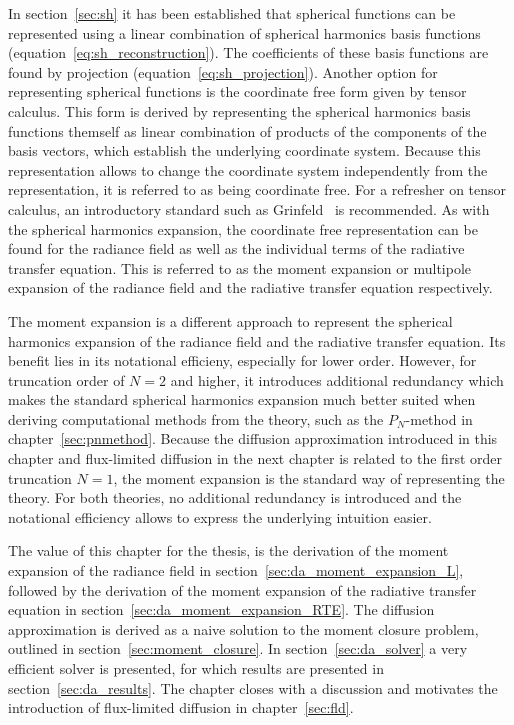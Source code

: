 In section~\ref{sec:sh} it has been established that spherical functions can be represented using a linear combination of spherical harmonics basis functions (equation~\ref{eq:sh_reconstruction}). The coefficients of these basis functions are found by projection (equation~\ref{eq:sh_projection}). Another option for representing spherical functions is the coordinate free form given by tensor calculus. This form is derived by representing the spherical harmonics basis functions themself as linear combination of products of the components of the basis vectors, which establish the underlying coordinate system. Because this representation allows to change the coordinate system independently from the representation, it is referred to as being coordinate free. For a refresher on tensor calculus, an introductory standard such as Grinfeld~\cite{Grinfeld13} is recommended. As with the spherical harmonics expansion, the coordinate free representation can be found for the radiance field as well as the individual terms of the radiative transfer equation. This is referred to as the moment expansion or multipole expansion of the radiance field and the radiative transfer equation respectively.

The moment expansion is a different approach to represent the spherical harmonics expansion of the radiance field and the radiative transfer equation. Its benefit lies in its notational efficieny, especially for lower order. However, for truncation order of $N=2$ and higher, it introduces additional redundancy which makes the standard spherical harmonics expansion much better suited when deriving computational methods from the theory, such as the $P_N$-method in chapter~\ref{sec:pnmethod}. Because the diffusion approximation introduced in this chapter and flux-limited diffusion in the next chapter is related to the first order truncation $N=1$, the moment expansion is the standard way of representing the theory. For both theories, no additional redundancy is introduced and the notational efficiency allows to express the underlying intuition easier.

The value of this chapter for the thesis, is the derivation of the moment expansion of the radiance field in section~\ref{sec:da_moment_expansion_L}, followed by the derivation of the moment expansion of the radiative transfer equation in section~\ref{sec:da_moment_expansion_RTE}. The diffusion approximation is derived as a naive solution to the moment closure problem, outlined in section~\ref{sec:moment_closure}. In section~\ref{sec:da_solver} a very efficient solver is presented, for which results are presented in section~\ref{sec:da_results}. The chapter closes with a discussion and motivates the introduction of flux-limited diffusion in chapter~\ref{sec:fld}.










